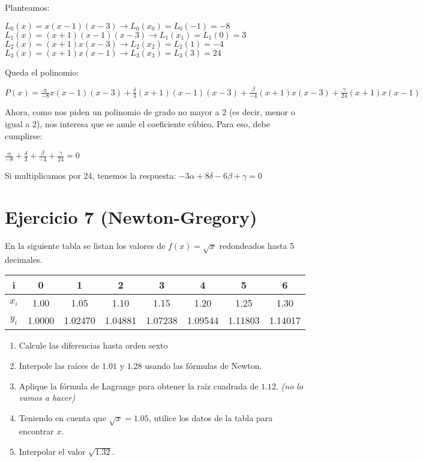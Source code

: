 \documentclass[11pt]{article}
\begin{document}
	Planteamos:
	
	$L_0(x)=x(x-1)(x-3) \rightarrow L_0(x_0)=L_0(-1)=-8$\\
	$L_1(x)=(x+1)(x-1)(x-3) \rightarrow L_1(x_1)=L_1(0)=3$\\
	$L_2(x)=(x+1)x(x-3) \rightarrow L_2(x_2)=L_2(1)=-4$\\
	$L_3(x)=(x+1)x(x-1) \rightarrow L_3(x_3)=L_3(3)=24$
	
	Queda el polinomio:
	
	$\displaystyle P(x)=\frac{\alpha}{-8}x(x-1)(x-3)+\frac{\delta}{3}(x+1)(x-1)(x-3)+\frac{\beta}{-4}(x+1)x(x-3)+\frac{\gamma}{24}(x+1)x(x-1)$
	
	Ahora, como nos piden un polinomio de grado no mayor a 2 (es decir, menor o igual a 2), nos interesa que se anule el coeficiente cúbico. Para eso, debe cumplirse:
	
	$\displaystyle \frac{\alpha}{-8}+\frac{\delta}{3}+\frac{\beta}{-4}+\frac{\gamma}{24}=0$
	
	Si multiplicamos por 24, tenemos la respuesta: $-3\alpha+8\delta-6\beta+\gamma=0$
	
	\section{Ejercicio 7 (Newton-Gregory)}
	En la siguiente tabla se listan los valores de $f(x)=\sqrt x$ redondeados hasta 5 decimales.
	
	\begin{tabular}{|c|c|c|c|c|c|c|c|}
		\hline
		i & 0 & 1 & 2 & 3 & 4 & 5 & 6 \\
		\hline
		$x_i$ & 1.00 & 1.05 & 1.10 & 1.15 & 1.20 & 1.25 & 1.30\\
		\hline
		$y_i$ & 1.0000 & 1.02470 & 1.04881 & 1.07238 & 1.09544 & 1.11803 & 1.14017\\
		\hline
	\end{tabular}

\begin{enumerate}[label=\alph*)]
	\item Calcule las diferencias hasta orden sexto
	\item Interpole las raíces de $1.01$ y $1.28$ usando las fórmulas de Newton.
	\item Aplique la fórmula de Lagrange para obtener la raíz cuadrada de $1.12$. \textit{(no lo vamos a hacer)}
	\item Teniendo en cuenta que $\sqrt{x}=1.05$, utilice los datos de la tabla para encontrar $x$.
	\item Interpolar el valor $\sqrt{1.32}$.
\end{enumerate}
\end{document}
